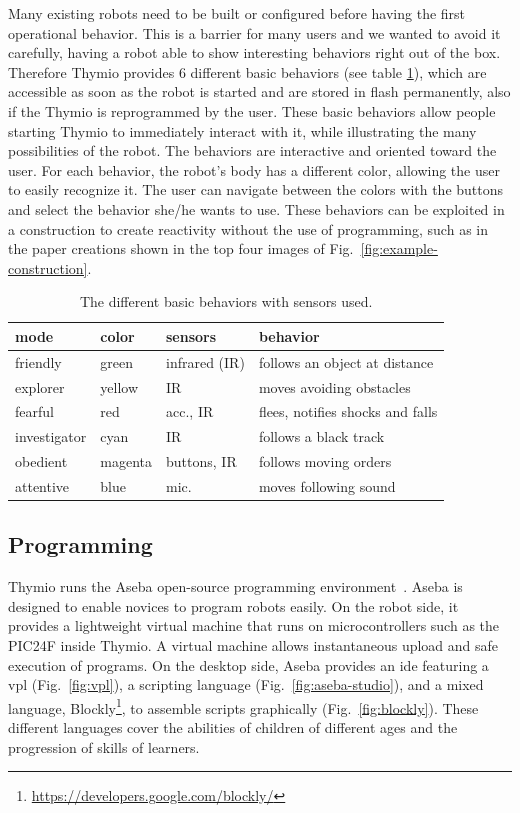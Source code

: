 \documentclass[letterpaper, 10 pt, conference]{ieeeconf}  %
\begin{document}
Many existing robots need to be built or configured before having the first operational behavior. 
This is a barrier for many users and we wanted to avoid it carefully, having a robot able to show interesting behaviors right out of the box.
Therefore Thymio provides 6 different basic behaviors (see table \ref{tbl:basic-behaviors}), which are accessible as soon as the robot is started and are stored in flash permanently, also if the Thymio is reprogrammed by the user.
These basic behaviors allow people starting Thymio to immediately interact with it, while illustrating the many possibilities of the robot.
The behaviors are interactive and oriented toward the user. %
For each behavior, the robot's body has a different color, allowing the user to easily recognize it.
The user can navigate between the colors with the buttons and select the behavior she/he wants to use.
These behaviors can be exploited in a construction to create reactivity without the use of programming, such as in the paper creations shown in the top four images of Fig.~\ref{fig:example-construction}.

\begin{table}
\begin{tabularx}{\columnwidth}{@{}llll@{}}
\toprule
mode & color & sensors & behavior \\
\midrule
friendly & green & infrared (IR) & follows an object at distance \\
explorer & yellow & IR & moves avoiding obstacles \\
fearful & red & acc., IR & flees, notifies shocks and falls \\
investigator & cyan & IR & follows a black track \\
obedient & magenta & buttons, IR & follows moving orders \\
attentive & blue & mic. & moves following sound \\
\bottomrule
\end{tabularx}
\caption{The different basic behaviors with sensors used.}
\label{tbl:basic-behaviors}
\end{table}


\subsection{Programming}
\label{sec:aseba}

Thymio runs the Aseba open-source programming environment~\cite{aseba}.
Aseba is designed to enable novices to program robots easily.
On the robot side, it provides a lightweight virtual machine that runs on microcontrollers such as the PIC24F inside Thymio.
A virtual machine allows instantaneous upload and safe execution of programs.
On the desktop side, Aseba provides an \ac{ide} featuring a \ac{vpl} (Fig.~\ref{fig:vpl}), a scripting language (Fig.~\ref{fig:aseba-studio}), and a mixed language, Blockly\footnote{\url{https://developers.google.com/blockly/}}, to assemble scripts graphically (Fig.~\ref{fig:blockly}).
These different languages cover the abilities of children of different ages and the progression of skills of learners.
\end{document}
